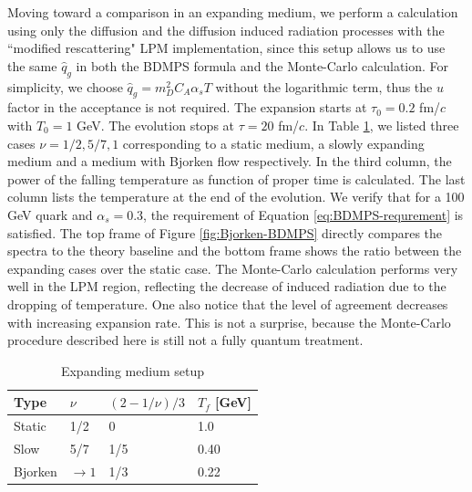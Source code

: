 \documentclass[aps, prc, reprint, amsmath, groupedaddress, nofootinbib]{revtex4-1}
\begin{document}
Moving toward a comparison in an expanding medium, we perform a calculation using only the diffusion and the diffusion induced radiation  processes with the ``modified rescattering" LPM implementation, since this setup allows us to use the same $\hat{q}_g$ in both the BDMPS formula and the Monte-Carlo calculation.
For simplicity, we choose $\hat{q}_g = m_D^2 C_A\alpha_s T$ without the logarithmic term, thus the $u$ factor in the acceptance is not required. 
The expansion starts at $\tau_0=0.2$ fm/$c$ with $T_0=1$ GeV. 
The evolution stops at $\tau = 20$ fm/$c$. 
In Table \ref{tab:expand}, we listed three cases $\nu = 1/2, 5/7, 1$ corresponding to a static medium, a slowly expanding medium and a medium with Bjorken flow respectively.
In the third column, the power of the falling temperature as function of proper time is calculated. The last column lists the temperature at the end of the evolution.
We verify that for a 100 GeV quark and $\alpha_s = 0.3$, the requirement of Equation \ref{eq:BDMPS-requrement} is satisfied.
The top frame of Figure \ref{fig:Bjorken-BDMPS} directly compares the spectra to the theory baseline and the bottom frame shows the ratio between the expanding cases over the static case. 
The Monte-Carlo calculation performs very well in the LPM region, reflecting the decrease of induced radiation due to the dropping of temperature.
One also notice that the level of agreement decreases with increasing expansion rate. 
This is not a surprise, because the Monte-Carlo procedure described here is still not a fully quantum treatment.
\begin{center}
\begin{table}[h]
\caption{Expanding medium setup}\label{tab:expand}
\begin{tabularx}{\columnwidth}{XXXX}
\hline
Type & $\nu$ & $(2-1/\nu)/3$ & $T_f$ [GeV]\\ 
\hline
Static & 1/2 & 0 & 1.0\\
\hline
Slow & 5/7 & 1/5 & 0.40\\
\hline
Bjorken & $\rightarrow 1$ & 1/3 & 0.22\\
\hline
\end{tabularx} 
\end{table}
\end{center}
\end{document}
